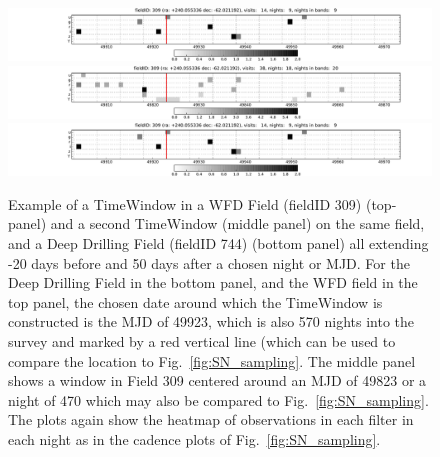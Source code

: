  \begin{center}
\begin{figure}
 \includegraphics[width=\textwidth]{figs/supernova/TimeWindow_309_49923.pdf}
 \includegraphics[width=\textwidth]{figs/supernova/TimeWindow_309_49823.pdf}
 \includegraphics[width=\textwidth]{figs/supernova/TimeWindow_744_49923.pdf}
 \label{fig:TimeWindow}
 \caption{Example of a TimeWindow in a WFD Field (fieldID 309) (top-panel) and a second TimeWindow (middle panel) on the same field, and a Deep Drilling Field (fieldID 744) (bottom panel) all extending -20 days before and 50 days after a chosen night or MJD. For the Deep Drilling Field in the bottom panel, and the WFD field in the top  panel, the chosen date around which the TimeWindow is constructed is the MJD of 49923, which is also 570 nights into the survey and marked by a red vertical line (which can be used to compare the location to Fig.~\ref{fig:SN_sampling}. The middle panel shows a window in Field 309 centered around an MJD of 49823 or a night of 470 which may also be compared to Fig.~\ref{fig:SN_sampling}. The plots again show the heatmap of observations in each filter in each night as in the cadence plots of Fig.~\ref{fig:SN_sampling}.}
\end{figure}
 \end{center}


